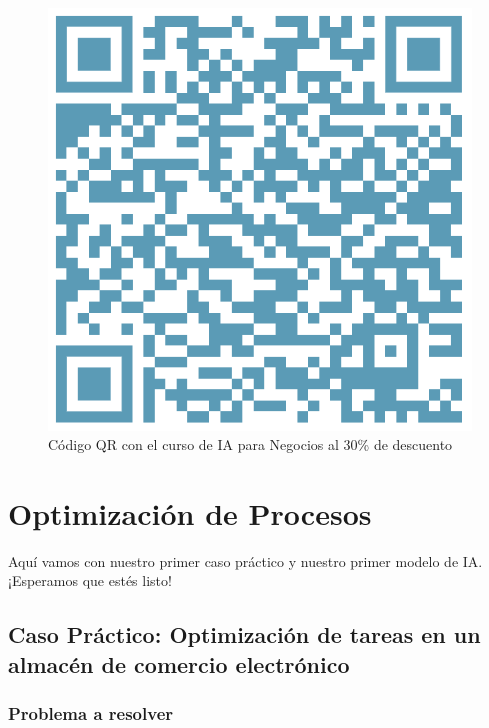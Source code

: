 \documentclass[
]{book}
\begin{document}
\begin{figure}
\centering
\includegraphics{Images/qr_course.png}
\caption{Código QR con el curso de IA para Negocios al 30\% de descuento}
\end{figure}

\hypertarget{optimizaciuxf3n-de-procesos}{%
\chapter{Optimización de Procesos}\label{optimizaciuxf3n-de-procesos}}

Aquí vamos con nuestro primer caso práctico y nuestro primer modelo de IA. ¡Esperamos que estés listo!

\hypertarget{caso-pruxe1ctico-optimizaciuxf3n-de-tareas-en-un-almacuxe9n-de-comercio-electruxf3nico}{%
\section{Caso Práctico: Optimización de tareas en un almacén de comercio electrónico}\label{caso-pruxe1ctico-optimizaciuxf3n-de-tareas-en-un-almacuxe9n-de-comercio-electruxf3nico}}

\hypertarget{problema-a-resolver}{%
\subsection{Problema a resolver}\label{problema-a-resolver}}
\end{document}
